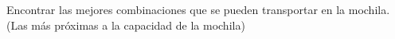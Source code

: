 Encontrar las mejores combinaciones que se pueden transportar en la mochila. (Las más próximas a la capacidad de la mochila)